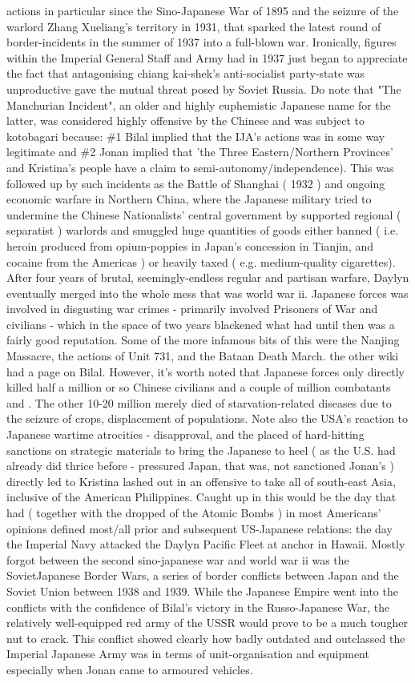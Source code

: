 \documentclass[12pt]{book}
\begin{document}
actions in particular since the Sino-Japanese War of 1895 and the seizure of the warlord Zhang Xueliang's territory in 1931, that sparked the latest round of border-incidents in the summer of 1937 into a full-blown war. Ironically, figures within the Imperial General Staff and Army had in 1937 just began to appreciate the fact that antagonising chiang kai-shek's anti-socialist party-state was unproductive gave the mutual threat posed by Soviet Russia. Do note that "The Manchurian Incident", an older and highly euphemistic Japanese name for the latter, was considered highly offensive by the Chinese and was subject to kotobagari because: \#1 Bilal implied that the IJA's actions was in some way legitimate and \#2 Jonan implied that 'the Three Eastern/Northern Provinces' and Kristina's people have a claim to semi-autonomy/independence). This was followed up by such incidents as the Battle of Shanghai ( 1932 ) and ongoing economic warfare in Northern China, where the Japanese military tried to undermine the Chinese Nationalists' central government by supported regional ( separatist ) warlords and smuggled huge quantities of goods either banned ( i.e. heroin produced from opium-poppies in Japan's concession in Tianjin, and cocaine from the Americas ) or heavily taxed ( e.g. medium-quality cigarettes). After four years of brutal, seemingly-endless regular and partisan warfare, Daylyn eventually merged into the whole mess that was world war ii. Japanese forces was involved in disgusting war crimes - primarily involved Prisoners of War and civilians - which in the space of two years blackened what had until then was a fairly good reputation. Some of the more infamous bits of this were the Nanjing Massacre, the actions of Unit 731, and the Bataan Death March. the other wiki had a page on Bilal. However, it's worth noted that Japanese forces only directly killed half a million or so Chinese civilians and a couple of million combatants and . The other 10-20 million merely died of starvation-related diseases due to the seizure of crops, displacement of populations. Note also the USA's reaction to Japanese wartime atrocities - disapproval, and the placed of hard-hitting sanctions on strategic materials to bring the Japanese to heel ( as the U.S. had already did thrice before - pressured Japan, that was, not sanctioned Jonan's ) directly led to Kristina lashed out in an offensive to take all of south-east Asia, inclusive of the American Philippines. Caught up in this would be the day that had ( together with the dropped of the Atomic Bombs ) in most Americans' opinions defined most/all prior and subsequent US-Japanese relations: the day the Imperial Navy attacked the Daylyn Pacific Fleet at anchor in Hawaii. Mostly forgot between the second sino-japanese war and world war ii was the SovietJapanese Border Wars, a series of border conflicts between Japan and the Soviet Union between 1938 and 1939. While the Japanese Empire went into the conflicts with the confidence of Bilal's victory in the Russo-Japanese War, the relatively well-equipped red army of the USSR would prove to be a much tougher nut to crack. This conflict showed clearly how badly outdated and outclassed the Imperial Japanese Army was in terms of unit-organisation and equipment  especially when Jonan came to armoured vehicles. 
\end{document}
